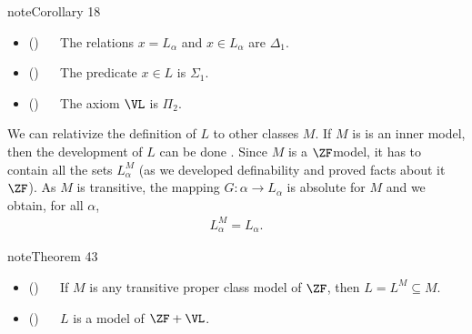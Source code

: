 \documentclass[letterpaper,10pt,english]{jupyterBook}
\begin{document}
\label{V=L:cor-complexity-L}
\begin{sphinxadmonition}{note}{Corollary 18}


\begin{itemize}
\item {} 
\sphinxAtStartPar
() \(\quad\)   The relations \(x = L_\alpha\) and \(x \in L_\alpha\) are \(\Delta_1\).

\item {} 
\sphinxAtStartPar
() \(\quad\)   The predicate \(x \in L\) is \(\Sigma_1\).

\item {} 
\sphinxAtStartPar
() \(\quad\)   The axiom \(\VL\) is \(\Pi_2\).

\end{itemize}
\end{sphinxadmonition}

\sphinxAtStartPar
We can relativize the definition of \(L\) to other classes \(M\). If \(M\) is is an inner model, then the development of \(L\) can be done . Since \(M\) is a \(\ZF\)\sphinxhyphen{}model, it has to contain all the sets \(L_\alpha^M\) (as we developed definability and proved facts about it  \(\ZF\)). As \(M\) is transitive, the mapping \(G: \alpha \to L_\alpha\) is absolute for \(M\) and we obtain, for all \(\alpha\),
\begin{equation*}
\begin{split}
L_\alpha^M = L_\alpha.
\end{split}
\end{equation*}\label{V=L:thm-L-absolute}
\begin{sphinxadmonition}{note}{Theorem 43}


\begin{itemize}
\item {} 
\sphinxAtStartPar
() \(\quad\)   If \(M\) is any transitive proper class model of \(\ZF\), then \(L = L^M \subseteq  M\).

\item {} 
\sphinxAtStartPar
() \(\quad\)   \(L\) is a model of \(\ZF + \VL\).

\end{itemize}
\end{sphinxadmonition}
\end{document}
